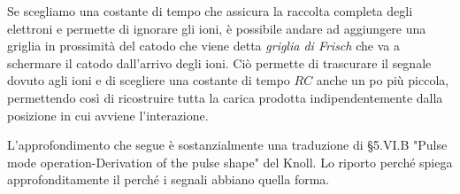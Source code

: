 Se scegliamo una costante di tempo che assicura la raccolta completa degli elettroni e permette di ignorare gli ioni, è possibile andare ad aggiungere una griglia in prossimità del catodo che viene detta \textit{griglia di Frisch} che va a schermare il catodo dall'arrivo degli ioni. Ciò permette di trascurare il segnale dovuto agli ioni e di scegliere una costante di tempo $RC$ anche un po più piccola, permettendo così di ricostruire tutta la carica prodotta indipendentemente dalla posizione in cui avviene l'interazione. 

\begin{approfondimento}
   \footnotesize
   L'approfondimento che segue è sostanzialmente una traduzione di \S 5.VI.B "Pulse mode operation-Derivation of the pulse shape" del Knoll. Lo riporto perché spiega approfonditamente il perché i segnali abbiano quella forma.


\end{approfondimento}
